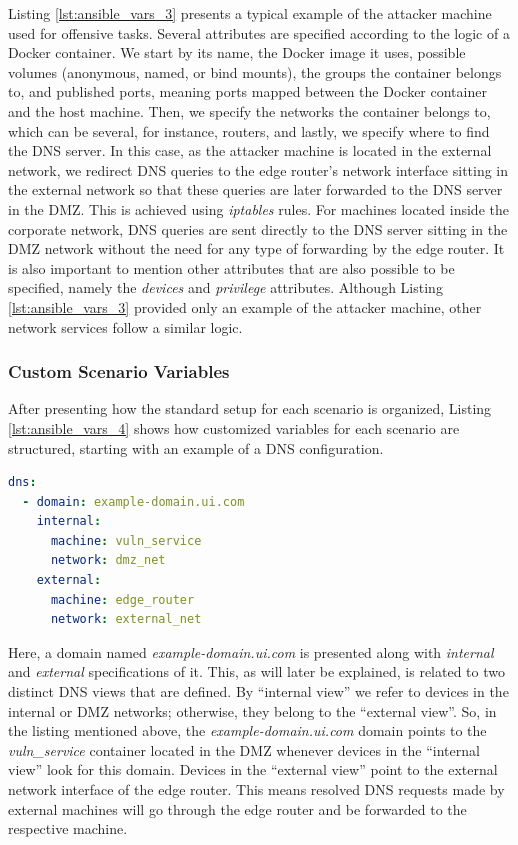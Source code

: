 Listing \ref{lst:ansible_vars_3} presents a typical example of the attacker machine used for offensive tasks. Several attributes are specified according to the logic of a Docker container. We start by its name, the Docker image it uses, possible volumes (anonymous, named, or bind mounts), the groups the container belongs to, and published ports, meaning ports mapped between the Docker container and the host machine. Then, we specify the networks the container belongs to, which can be several, for instance, routers, and lastly, we specify where to find the DNS server. In this case, as the attacker machine is located in the external network, we redirect DNS queries to the edge router's network interface sitting in the external network so that these queries are later forwarded to the DNS server in the DMZ. This is achieved using \textit{iptables} rules. For machines located inside the corporate network, DNS queries are sent directly to the DNS server sitting in the DMZ network without the need for any type of forwarding by the edge router. It is also important to mention other attributes that are also possible to be specified, namely the \textit{devices} and \textit{privilege} attributes. Although Listing \ref{lst:ansible_vars_3} provided only an example of the attacker machine, other network services follow a similar logic.

\subsubsection{Custom Scenario Variables} \label{sec:custom_scenario_variables}

After presenting how the standard setup for each scenario is organized, Listing \ref{lst:ansible_vars_4} shows how customized variables for each scenario are structured, starting with an example of a DNS configuration.

\begin{lstlisting}[language=yaml,caption=Ansible Variables - DNS.,numbers=none,label={lst:ansible_vars_4}]
dns:
  - domain: example-domain.ui.com
    internal:
      machine: vuln_service
      network: dmz_net
    external:
      machine: edge_router
      network: external_net
\end{lstlisting}

Here, a domain named \textit{example-domain.ui.com} is presented along with \textit{internal} and \textit{external} specifications of it. This, as will later be explained, is related to two distinct DNS views that are defined. By ``internal view'' we refer to devices in the internal or DMZ networks; otherwise, they belong to the ``external view''. So, in the listing mentioned above, the \textit{example-domain.ui.com} domain points to the \textit{vuln\_service} container located in the DMZ whenever devices in the ``internal view'' look for this domain. Devices in the ``external view'' point to the external network interface of the edge router. This means resolved DNS requests made by external machines will go through the edge router and be forwarded to the respective machine. 

